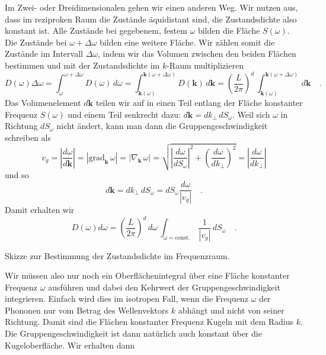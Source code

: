 Im Zwei- oder Dreidimensionalen gehen wir einen anderen Weg. Wir nutzen aus, dass im reziproken Raum die Zustände äquidistant sind, die Zustandsdichte also konstant ist. Alle Zustände bei gegebenem, festem $\omega$ bilden die Fläche $S(\omega)$. Die Zustände bei $\omega + \Delta\omega$ bilden eine weitere Fläche. Wir zählen somit die Zustände im Intervall $\Delta\omega$, indem wir das Volumen zwischen den beiden Flächen bestimmen und mit der Zustandsdichte im $k$-Raum multiplizieren
\begin{equation}
D(\omega) \Delta\omega 
= \int_{\omega}^{\omega + \Delta\omega } D(\omega) \, d \omega
= \int_{\mathbf{k}(\omega)}^{\mathbf{k}(\omega + \Delta\omega) } D(\mathbf{k}) \, d \mathbf{k}
=
\left( \frac{L}{2 \pi} \right)^d \, 
\int_{\mathbf{k}(\omega)}^{\mathbf{k}(\omega + \Delta\omega) } 
 \, d \mathbf{k} \quad .
\end{equation}
Das Volumenelement $d \mathbf{k}$ teilen wir auf in einen Teil entlang der Fläche konstanter Frequenz $S(\omega)$ und einem Teil senkrecht dazu:  $d \mathbf{k} = dk_\perp \, dS_\omega$. Weil sich $\omega$ in Richtung $ dS_\omega$ nicht ändert,  kann man dann die Gruppengeschwindigkeit schreiben als
\begin{equation}
v_g = \left| \frac{d\omega}{d \mathbf{k}} \right| 
= \left| \text{grad}_\mathbf{k}  \, \omega \right| 
= \left| \nabla_\mathbf{k} \,  \omega \right| 
= \sqrt{ \left| \frac{d\omega}{d S_\omega}\right| ^2 +
\left(\frac{d\omega}{d k_\perp}\right)^2  } 
= \left| \frac{d\omega}{d k_\perp} \right|
\end{equation}
und so
\begin{equation}
d \mathbf{k} = dk_\perp \, dS_\omega = dS_\omega \frac{d \omega}{|v_g|} \quad .
\end{equation}
Damit erhalten wir
\begin{equation}
D(\omega) d\omega = \left( \frac{L}{2 \pi} \right)^d \, d\omega \, \int_{\omega = \text{const.}}\,   \frac{1}{|v_g|} \, dS_\omega \quad . \label{eq:WK_dos_omega}
\end{equation}
\begin{marginfigure}

\caption{Skizze zur Bestimmung der Zustandsdichte im Frequenzraum.}
\end{marginfigure}
Wir müssen also nur noch ein Oberflächenintegral über eine Fläche konstanter Frequenz $\omega$ ausführen und dabei den Kehrwert der Gruppengeschwindigkeit integrieren. Einfach wird dies im isotropen Fall, wenn die Frequenz $\omega$ der Phononen nur vom Betrag des Wellenvektors $k$ abhängt und nicht von seiner Richtung. Damit sind die Flächen konstanter Frequenz Kugeln mit dem Radius $k$.  Die Gruppengeschwindigkeit ist dann natürlich auch konstant über die Kugeloberfläche. Wir erhalten dann
